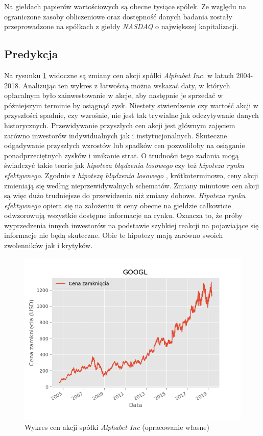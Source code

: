\documentclass[a4paper, twoside, 11pt, openright]{article}
\begin{document}
\bigskip

Na giełdach papierów wartościowych są obecne tysiące spółek. Ze względu na ograniczone zasoby obliczeniowe oraz dostępność danych badania zostały przeprowadzone na spółkach z giełdy \textit{NASDAQ} o największej kapitalizacji.

\subsection{Predykcja}

Na rysunku \ref{img:alphabet_history} widoczne są zmiany cen akcji spółki \textit{Alphabet Inc.} w latach 2004-2018. Analizując ten wykres z łatwością można wskazać daty, w których opłacalnym było zainwestowanie w akcje, aby następnie je sprzedać w póżniejszym terminie by osiągnąć zysk. Niestety stwierdzenie czy wartość akcji w przyszłości spadnie, czy wzrośnie, nie jest tak trywialne jak odczytywanie danych historycznych. Przewidywanie przyszłych cen akcji jest głównym zajęciem zarówno inwestorów indywidualnych jak i instytucjonalnych. Skuteczne odgadywanie przyszłych wzrostów lub spadków cen pozwoliłoby na osiąganie ponadprzeciętnych zysków i unikanie strat. O trudności tego zadania mogą świadczyć takie teorie jak \textit{hipoteza błądzenia losowego} czy też \textit{hipoteza rynku efektywnego}. Zgodnie z \textit{hipotezą błądzenia losowego} \cite{randwalk}, krótkoterminowo, ceny akcji zmieniają się według nieprzewidywalnych schematów. Zmiany minutowe cen akcji są więc dużo trudniejsze do przewidzenia niż zmiany dobowe. \textit{Hipoteza rynku efektywnego} \cite{efficientmarket} opiera się na założeniu iż ceny obecne na giełdzie całkowicie odwzorowują wszystkie dostępne informacje na rynku. Oznacza to, że próby wyprzedzenia innych inwestorów na podstawie szybkiej reakcji na pojawiające się informacje nie będą skuteczne. Obie te hipotezy mają zarówno swoich zwolenników jak i krytyków.

\begin{figure}[H]
\centering \includegraphics[scale=0.9]{img/GOOGL_adj_close.png}
\caption{Wykres cen akcji spółki \textit{Alphabet Inc} (opracowanie własne)}
\label{img:alphabet_history}
\end{figure}
\end{document}
